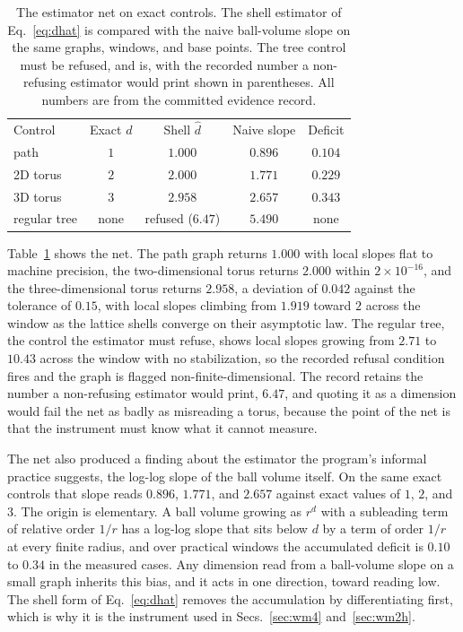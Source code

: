 \documentclass[aps,pre,reprint,nofootinbib]{revtex4-2}
\begin{document}
\begin{table}[t]
\caption{The estimator net on exact controls.  The shell estimator of
Eq.~\eqref{eq:dhat} is compared with the naive ball-volume slope on
the same graphs, windows, and base points.  The tree control must be
refused, and is, with the recorded number a non-refusing estimator
would print shown in parentheses.  All numbers are from the committed
evidence record.}
\label{tab:wm0}
\begin{ruledtabular}
\begin{tabular}{lcccc}
Control & Exact $d$ & Shell $\hat d$ & Naive slope & Deficit \\
\colrule
path            & $1$ & $1.000$ & $0.896$ & $0.104$ \\
2D torus        & $2$ & $2.000$ & $1.771$ & $0.229$ \\
3D torus        & $3$ & $2.958$ & $2.657$ & $0.343$ \\
regular tree    & none & refused ($6.47$) & $5.490$ & none \\
\end{tabular}
\end{ruledtabular}
\end{table}

Table~\ref{tab:wm0} shows the net.  The path graph returns $1.000$
with local slopes flat to machine precision, the two-dimensional torus
returns $2.000$ within $2\times10^{-16}$, and the three-dimensional
torus returns $2.958$, a deviation of $0.042$ against the tolerance of
$0.15$, with local slopes climbing from $1.919$ toward $2$ across the
window as the lattice shells converge on their asymptotic law.  The
regular tree, the control the estimator must refuse, shows local
slopes growing from $2.71$ to $10.43$ across the window with no
stabilization, so the recorded refusal condition fires and the graph
is flagged non-finite-dimensional.  The record retains the number a
non-refusing estimator would print, $6.47$, and quoting it as a
dimension would fail the net as
badly as misreading a torus, because the point of the net is
that the instrument must know what it cannot measure.

The net also produced a finding about the estimator the program's
informal practice suggests, the log-log slope of the ball volume
itself.  On the same exact controls that slope reads $0.896$, $1.771$,
and $2.657$ against exact values of $1$, $2$, and $3$.  The origin is
elementary.  A ball volume growing as $r^d$ with a subleading term
of relative order $1/r$ has a log-log slope that sits below $d$ by a term of
order $1/r$ at every finite radius, and over practical windows the
accumulated deficit is $0.10$ to $0.34$ in the measured cases.  Any
dimension read from a ball-volume slope on a small graph inherits this
bias, and it acts in one direction, toward reading low.  The shell
form of Eq.~\eqref{eq:dhat} removes the accumulation by
differentiating first, which is why it is the instrument used in
Secs.~\ref{sec:wm4} and~\ref{sec:wm2h}.
\end{document}
